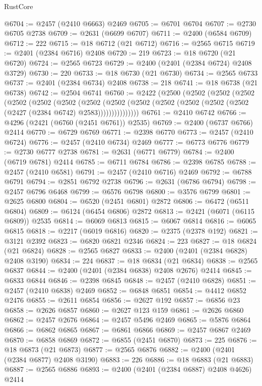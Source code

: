 \begin{lexlean}{RustCore}
\begin{coremodule}
@6704 := @2457 (@2410 @6663) @2469
@6705 := @6701 @6704
@6707 := @2730 @6705 @2738
@6709 := @2631 (@6699 @6707)
@6711 := @2400 (@6584 @6709)
@6712 := 222
@6715 := @18 @6712 (@21 @6712)
@6716 := @2565 @6715
@6719 := @2401 (@2384 @6716) @2408
@6720 := 219
@6723 := @18 @6720 (@21 @6720)
@6724 := @2565 @6723
@6729 := @2400 (@2401 (@2384 @6724) @2408 @3729)
@6730 := 220
@6733 := @18 @6730 (@21 @6730)
@6734 := @2565 @6733
@6737 := @2401 (@2384 @6734) @2408
@6738 := 218
@6741 := @18 @6738 (@21 @6738)
@6742 := @2504 @6741
@6760 := @2422
    (@2500
      (@2502
        (@2502
          (@2502
            (@2502
              (@2502
                (@2502
                  (@2502
                    (@2502
                      (@2502 (@2502 (@2502 (@2502 (@2502 (@2427 (@2384 @6742) @2583)))))))))))))))
@6761 := @2410 @6742
@6766 := @4296 (@2421 (@6760 (@2451 @6761)) @2535)
@6769 := @2400 (@6737 @6766) @2414
@6770 := @6729 @6769
@6771 := @2398 @6770
@6773 := @2457 (@2410 @6724)
@6776 := @2457 (@2410 @6734) @2469
@6777 := @6773 @6776
@6779 := @2730 @6777 @2738
@6781 := @2631 (@6771 @6779)
@6784 := @2400 (@6719 @6781) @2414
@6785 := @6711 @6784
@6786 := @2398 @6785
@6788 := @2457 (@2410 @6581)
@6791 := @2457 (@2410 @6716) @2469
@6792 := @6788 @6791
@6794 := @2851 @6792 @2738
@6796 := @2631 (@6786 @6794)
@6798 := @2457 @6796 @6468
@6799 := @6576 @6798
@6800 := @3576 @6799
@6801 := @2625 @6800
@6804 := @6520 (@2451 @6801) @2872
@6806 := @6472 (@6511 @6804)
@6809 := @6124 (@6454 @6806) @2872
@6813 := @2421 (@6071 (@6115 @6809)) @2535
@6814 := @6069 @6813
@6815 := @6067 @6814
@6816 := @6065 @6815
@6818 := @2217 (@6019 @6816)
@6820 := @2375 (@2378 @192)
@6821 := @3121 @2392
@6823 := @6820 @6821 @2346
@6824 := 223
@6827 := @18 @6824 (@21 @6824)
@6828 := @2565 @6827
@6833 := @2400 (@2401 (@2384 @6828) @2408 @3190)
@6834 := 224
@6837 := @18 @6834 (@21 @6834)
@6838 := @2565 @6837
@6844 := @2400 (@2401 (@2384 @6838) @2408 @2676) @2414
@6845 := @6833 @6844
@6846 := @2398 @6845
@6848 := @2457 (@2410 @6828)
@6851 := @2457 (@2410 @6838) @2469
@6852 := @6848 @6851
@6854 := @4412 @6852 @2476
@6855 := @2611 @6854
@6856 := @2627 @192
@6857 := @6856 @23
@6858 := @2626 @6857
@6860 := @2627 @123 @159
@6861 := @2626 @6860
@6862 := @2457 @2676
@6864 := @2457 @5496 @2469
@6865 := @5876 @6864
@6866 := @6862 @6865
@6867 := @6861 @6866
@6869 := @2457 @6867 @2469
@6870 := @6858 @6869
@6872 := @6855 (@2451 @6870)
@6873 := 225
@6876 := @18 @6873 (@21 @6873)
@6877 := @2565 @6876
@6882 := @2400 (@2401 (@2384 @6877) @2408 @3190)
@6883 := 226
@6886 := @18 @6883 (@21 @6883)
@6887 := @2565 @6886
@6893 := @2400 (@2401 (@2384 @6887) @2408 @4626) @2414

\end{coremodule}
\end{lexlean}
